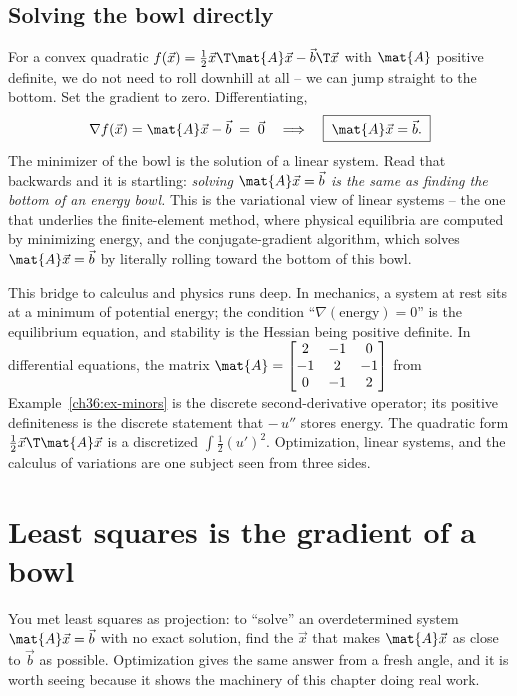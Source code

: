 \subsection{Solving the bowl directly}

For a convex quadratic $f(\vec{x})=\tfrac12\vec{x}\T\mat{A}\vec{x}-\vec{b}\T\vec{x}$
with $\mat{A}$ positive definite, we do not need to roll downhill at all -- we can
jump straight to the bottom. Set the gradient to zero. Differentiating,
\[
  \nabla f(\vec{x}) = \mat{A}\vec{x} - \vec{b} \;=\; \vec{0}
  \quad\Longrightarrow\quad \boxed{\;\mat{A}\vec{x} = \vec{b}.\;}
\]
The minimizer of the bowl is the solution of a linear system. Read that backwards and
it is startling: \emph{solving $\mat{A}\vec{x}=\vec{b}$ is the same as finding the
bottom of an energy bowl.} This is the variational view of linear systems -- the one
that underlies the finite-element method, where physical equilibria are computed by
minimizing energy, and the conjugate-gradient algorithm, which solves $\mat{A}\vec{x}
=\vec{b}$ by literally rolling toward the bottom of this bowl.

\begin{connectionbox}
This bridge to calculus and physics runs deep. In mechanics, a system at rest sits at
a minimum of potential energy; the condition ``$\nabla(\text{energy})=0$'' is the
equilibrium equation, and stability is the Hessian being positive definite. In
differential equations, the matrix $\mat{A}=\begin{bmatrix}2&-1&0\\-1&2&-1\\0&-1&2\end{bmatrix}$
from Example~\ref{ch36:ex-minors} is the discrete second-derivative operator; its
positive definiteness is the discrete statement that $-\,u''$ stores energy. The
quadratic form $\tfrac12\vec{x}\T\mat{A}\vec{x}$ is a discretized
$\int \tfrac12 (u')^2$. Optimization, linear systems, and the calculus of variations
are one subject seen from three sides.
\end{connectionbox}

\section{Least squares is the gradient of a bowl}
\label{ch36:least-squares}

You met least squares as projection: to ``solve'' an overdetermined system
$\mat{A}\vec{x}=\vec{b}$ with no exact solution, find the $\vec{x}$ that makes
$\mat{A}\vec{x}$ as close to $\vec{b}$ as possible. Optimization gives the same answer
from a fresh angle, and it is worth seeing because it shows the machinery of this
chapter doing real work.

